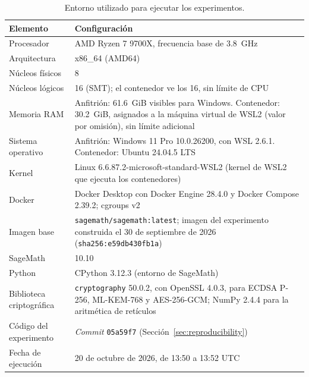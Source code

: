\begin{table}[H]
\centering
\caption{Entorno utilizado para ejecutar los experimentos.}
\label{tab:environment}
\begin{tabularx}{0.95\textwidth}{lY}
\toprule
\textbf{Elemento} & \textbf{Configuración} \\
\midrule

Procesador &
AMD Ryzen 7 9700X, frecuencia base de 3.8~GHz \\

Arquitectura &
x86\_64 (AMD64) \\

Núcleos físicos &
8 \\

Núcleos lógicos &
16 (SMT); el contenedor ve los 16, sin límite de CPU \\

Memoria RAM &
Anfitrión: 61.6~GiB visibles para Windows. Contenedor: 30.2~GiB, asignados a la máquina virtual de WSL2 (valor por omisión), sin límite adicional \\

Sistema operativo &
Anfitrión: Windows 11 Pro 10.0.26200, con WSL 2.6.1. Contenedor: Ubuntu 24.04.5 LTS \\

Kernel &
Linux 6.6.87.2-microsoft-standard-WSL2 (kernel de WSL2 que ejecuta los contenedores) \\

Docker &
Docker Desktop con Docker Engine 28.4.0 y Docker Compose 2.39.2; cgroups v2 \\

Imagen base &
\texttt{sagemath/sagemath:latest}; imagen del experimento construida el 30 de septiembre de 2026 (\texttt{sha256:e59db430fb1a}) \\

SageMath &
10.10 \\

Python &
CPython 3.12.3 (entorno de SageMath) \\

Biblioteca criptográfica &
\texttt{cryptography} 50.0.2, con OpenSSL 4.0.3, para ECDSA P-256, ML-KEM-768 y AES-256-GCM; NumPy 2.4.4 para la aritmética de retículos \\

Código del experimento &
\textit{Commit} \texttt{05a59f7} (Sección~\ref{sec:reproducibility}) \\

Fecha de ejecución &
20 de octubre de 2026, de 13:50 a 13:52 UTC \\

\bottomrule
\end{tabularx}
\end{table}

